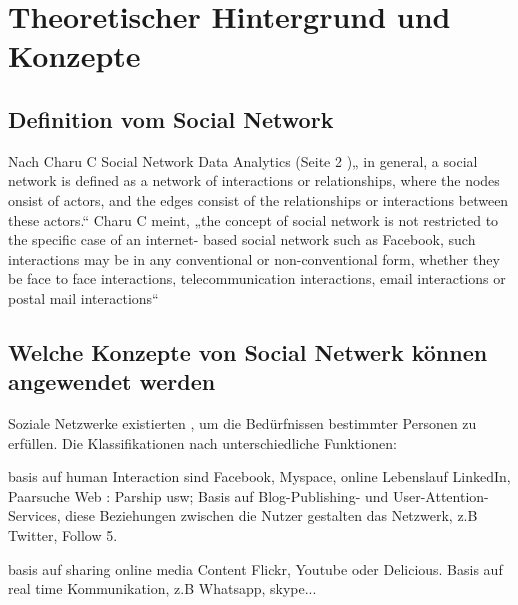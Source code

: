 
\chapter{Theoretischer Hintergrund und Konzepte}


\section{Definition vom Social Network}

Nach Charu C Social Network Data Analytics  (Seite 2 )„ in general, a social network is defined as a network of interactions or relationships, where the nodes onsist of actors, and the edges consist of the relationships or interactions between these actors.“ Charu C meint, „the concept of social network is not restricted to the specific case of an internet- based social network such as Facebook, such interactions may be in any conventional or non-conventional form, whether they be face to face interactions, telecommunication interactions, email interactions or postal mail interactions“


\section{Welche Konzepte von Social Netwerk können angewendet werden}

Soziale Netzwerke existierten , um die Bedürfnissen bestimmter Personen zu erfüllen. Die Klassifikationen nach unterschiedliche Funktionen:

basis auf human Interaction sind Facebook, Myspace, online Lebenslauf LinkedIn, Paarsuche Web : Parship usw;  Basis auf Blog-Publishing- und User-Attention-Services, diese Beziehungen zwischen die Nutzer gestalten das Netzwerk, z.B Twitter, Follow 5. 

basis auf sharing online media Content Flickr, Youtube oder Delicious.
Basis auf real time Kommunikation, z.B Whatsapp, skype...

